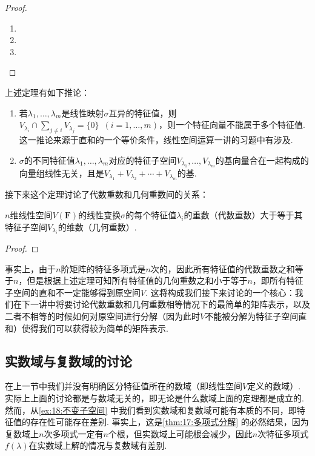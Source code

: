 \begin{proof}
    \begin{enumerate}
        \item

        \item

        \item
    \end{enumerate}
\end{proof}

上述定理有如下推论：
\begin{enumerate}
    \item 若$\lambda_1,\ldots,\lambda_m$是线性映射$\sigma$互异的特征值，则$V_{\lambda_i}\cap\sum\limits_{j\neq i}V_{\lambda_j}=\{0\}
              \enspace(i=1,\ldots,m)$，则一个特征向量不能属于多个特征值. 这一推论来源于直和的一个等价条件，线性空间运算一讲的习题中有涉及.

    \item $\sigma$的不同特征值$\lambda_1,\ldots,\lambda_m$对应的特征子空间$V_{\lambda_1},\ldots,V_{\lambda_m}$的基向量合在一起构成的向量组线性无关，且是$V_{\lambda_1}+V_{\lambda_2}+\cdots+V_{\lambda_m}$的基.
\end{enumerate}

接下来这个定理讨论了代数重数和几何重数间的关系：
\begin{theorem}\label{thm:18:代数重数与几何重数}
    $n$维线性空间$V(\mathbf{F})$的线性变换$\sigma$的每个特征值$\lambda_i$的重数（代数重数）大于等于其特征子空间$V_{\lambda_i}$的维数（几何重数）.
\end{theorem}

\begin{proof}

\end{proof}

事实上，由于$n$阶矩阵的特征多项式是$n$次的，因此所有特征值的代数重数之和等于$n$，但是根据上述定理可知所有特征值的几何重数之和小于等于$n$，即所有特征子空间的直和不一定能够得到原空间$V$. 这将构成我们接下来讨论的一个核心：我们在下一讲中将要讨论代数重数和几何重数相等情况下的最简单的矩阵表示，以及二者不相等的时候如何对原空间进行分解（因为此时$V$不能被分解为特征子空间直和）使得我们可以获得较为简单的矩阵表示.

\subsection{实数域与复数域的讨论}

在上一节中我们并没有明确区分特征值所在的数域（即线性空间$V$定义的数域）. 实际上上面的讨论都是与数域无关的，即无论是什么数域上面的定理都是成立的. 然而，从\autoref{ex:18:不变子空间} 中我们看到实数域和复数域可能有本质的不同，即特征值的存在性可能存在差别. 事实上，这是\autoref{thm:17:多项式分解} 的必然结果，因为复数域上$n$次多项式一定有$n$个根，但实数域上可能根会减少，因此$n$次特征多项式$f(\lambda)$在实数域上解的情况与复数域有差别.

